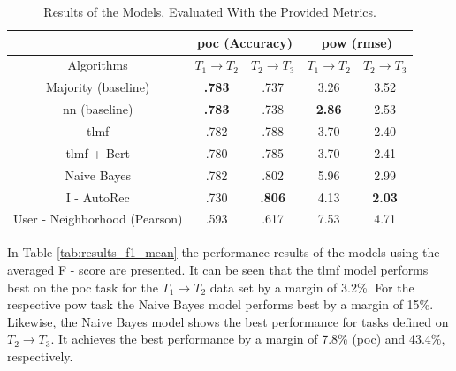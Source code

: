 \begin{table}[h!]
    \centering
    \begin{tabular}{|c|c|c|c|c|}
    \hline
     & \multicolumn{2}{|c|}{\acrshort{poc} (Accuracy)} & \multicolumn{2}{|c|}{\acrshort{pow} (\acrshort{rmse})} \\
     \hline
    Algorithms & $T_1 \to T_2$ & $T_2 \to T_3$ & $T_1 \to T_2$ & $T_2 \to T_3$\\
    \hline  Majority (baseline) & \textbf{.783} & .737 & 3.26 & 3.52 \\
    \acrshort{nn} (baseline) & \textbf{.783} & .738 & \textbf{2.86} & 2.53\\
    \acrshort{tlmf} & .782 & .788 & 3.70 & 2.40 \\
    \acrshort{tlmf} + Bert & .780 & .785 & 3.70 & 2.41\\
    Naive Bayes & .782 & .802 & 5.96 & 2.99 \\
    I - AutoRec & .730 & \textbf{.806} & 4.13 & \textbf{2.03}\\
    User - Neighborhood (Pearson) & .593 & .617 & 7.53 & 4.71\\
    \hline
    \end{tabular}
    \caption{Results of the Models, Evaluated With the Provided Metrics.}
    \label{tab:results}
\end{table}
\noindent In Table \ref{tab:results_f1_mean} the performance results of the models using the averaged F - score are presented. It can be seen that the \acrshort{tlmf} model performs best on the \acrshort{poc} task for the $T_1 \to T_2$ data set by a margin of 3.2\%. For the respective \acrshort{pow} task the Naive Bayes model performs best by a margin of 15\%. Likewise, the Naive Bayes model shows the best performance for tasks defined on $T_2 \to T_3$. It achieves the best performance by a margin of 7.8\% (\acrshort{poc}) and 43.4\%, respectively.


